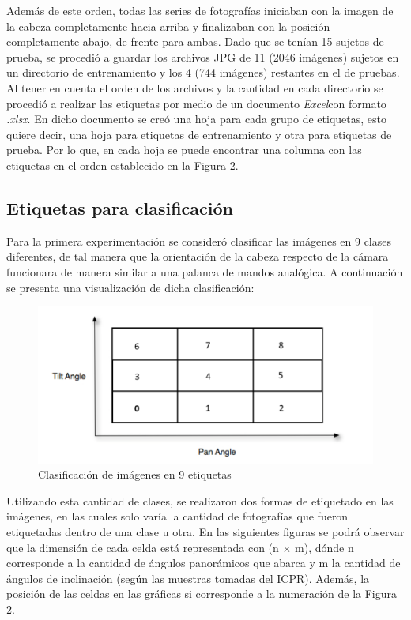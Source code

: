 Además de este orden, todas las series de fotografías iniciaban con la imagen de la cabeza completamente hacia arriba y finalizaban con la posición completamente abajo, de frente para ambas. Dado que se tenían 15 sujetos de prueba, se procedió a guardar los archivos JPG de 11 (2046 imágenes) sujetos en un directorio de entrenamiento y los 4 (744 imágenes) restantes en el de pruebas. Al tener en cuenta el orden de los archivos y la cantidad en cada directorio se procedió a realizar las etiquetas por medio de un documento \textit{Excel}con formato \textit{.xlsx}. En dicho documento se creó una hoja para cada grupo de etiquetas, esto quiere decir, una hoja para etiquetas de entrenamiento y otra para etiquetas de prueba. Por lo que, en cada hoja se puede encontrar una columna con las etiquetas en el orden establecido en la Figura 2.

\subsection{Etiquetas para clasificación}

Para la primera experimentación se consideró clasificar las imágenes en 9 clases diferentes, de tal manera que la orientación de la cabeza respecto de la cámara funcionara de manera similar a una palanca de mandos analógica. A continuación se presenta una visualización de dicha clasificación:

\begin{figure}[H]
	\centering
	\includegraphics[scale=1]{figures/clasi0.png}
	\caption{Clasificación de imágenes en 9 etiquetas}
	\label{fig:img3}
\end{figure}

Utilizando esta cantidad de clases, se realizaron dos formas de etiquetado en las imágenes, en las cuales solo varía la cantidad de fotografías que fueron etiquetadas dentro de una clase u otra. En las siguientes figuras se podrá observar que la dimensión de cada celda está representada con (n $\times$ m), dónde n corresponde a la cantidad de ángulos panorámicos que abarca y m la cantidad de ángulos de inclinación (según las muestras tomadas del ICPR). Además, la posición de las celdas en las gráficas si corresponde a la numeración de la Figura 2.


